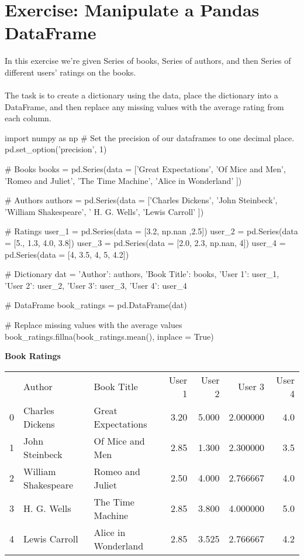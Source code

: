 \documentclass{article}
\begin{document}
\section{Exercise: Manipulate a Pandas DataFrame}\label{sec:exercise2}
In this exercise we're given Series of books, Series of authors, and then Series of different users' ratings on the books.
\\\\

The task is to create a dictionary using the data, place the dictionary into a DataFrame, and then replace any missing values with the average rating from each column.

\begin{python}
	import numpy as np
	# Set the precision of our dataframes to one decimal place.
	pd.set_option('precision', 1)
	
	# Books
	books = pd.Series(data = ['Great Expectations', 'Of Mice and Men', 'Romeo and Juliet', 'The Time Machine', 'Alice in Wonderland' ])
	
	# Authors
	authors = pd.Series(data = ['Charles Dickens', 'John Steinbeck', 'William Shakespeare', ' H. G. Wells', 'Lewis Carroll' ])
	
	# Ratings
	user_1 = pd.Series(data = [3.2, np.nan ,2.5])
	user_2 = pd.Series(data = [5., 1.3, 4.0, 3.8])
	user_3 = pd.Series(data = [2.0, 2.3, np.nan, 4])
	user_4 = pd.Series(data = [4, 3.5, 4, 5, 4.2])
	
	# Dictionary
	dat = {'Author': authors, 'Book Title': books, 'User 1': user_1,
		'User 2': user_2, 'User 3': user_3, 'User 4': user_4}
	
	# DataFrame
	book_ratings = pd.DataFrame(dat)
	
	# Replace missing values with the average values
	book_ratings.fillna(book_ratings.mean(), inplace = True)
\end{python}

\textbf{Book Ratings}
\begin{center}
	\begin{tabular}{lllrrrr}
		{} &               Author &           Book Title &  User 1 &  User 2 &    User 3 &  User 4 \\
		0 &      Charles Dickens &   Great Expectations &    3.20 &   5.000 &  2.000000 &     4.0 \\
		1 &       John Steinbeck &      Of Mice and Men &    2.85 &   1.300 &  2.300000 &     3.5 \\
		2 &  William Shakespeare &     Romeo and Juliet &    2.50 &   4.000 &  2.766667 &     4.0 \\
		3 &          H. G. Wells &     The Time Machine &    2.85 &   3.800 &  4.000000 &     5.0 \\
		4 &        Lewis Carroll &  Alice in Wonderland &    2.85 &   3.525 &  2.766667 &     4.2 \\
	\end{tabular}
\end{center}
\end{document}
